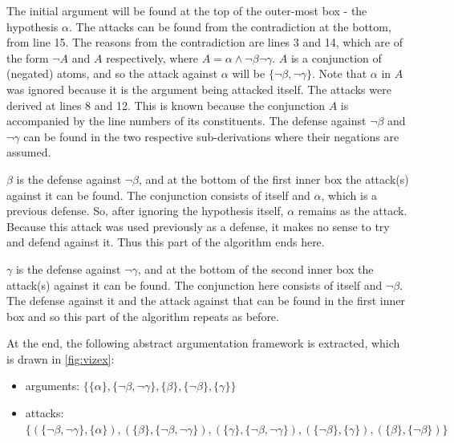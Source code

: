 \documentclass[11pt,twoside,a4paper]{report}
\begin{document}
The initial argument will be found at the top of the outer-most box - the hypothesis $\alpha$. The attacks can be found from the contradiction at the bottom, from line 15. The reasons from the contradiction are lines 3 and 14, which are of the form $\neg A$ and $A$ respectively, where $A = \alpha\wedge\neg\beta\neg\gamma$. $A$ is a conjunction of (negated) atoms, and so the attack against $\alpha$ will be $\{\neg\beta, \neg\gamma\}$. Note that $\alpha$ in $A$ was ignored because it is the argument being attacked itself. The attacks were derived at lines 8 and 12. This is known because the conjunction $A$ is accompanied by the line numbers of its constituents. The defense against $\neg\beta$ and $\neg\gamma$ can be found in the two respective sub-derivations where their negations are assumed. 

$\beta$ is the defense against $\neg\beta$, and at the bottom of the first inner box the attack(s) against it can be found. The conjunction consists of itself and $\alpha$, which is a previous defense. So, after ignoring the hypothesis itself, $\alpha$ remains as the attack. Because this attack was used previously as a defense, it makes no sense to try and defend against it. Thus this part of the algorithm ends here.

$\gamma$ is the defense against $\neg\gamma$, and at the bottom of the second inner box the attack(s) against it can be found. The conjunction here consists of itself and $\neg\beta$. The defense against it and the attack against that can be found in the first inner box and so this part of the algorithm repeats as before.

At the end, the following abstract argumentation framework is extracted, which is drawn in \autoref{fig:vizex}:
\begin{itemize}
\item
arguments: $\{\{\alpha\}, \{\neg\beta, \neg\gamma\}, \{\beta\}, \{\neg\beta\}, \{\gamma\}\}$
\item
attacks: $\{(\{\neg\beta, \neg\gamma\}, \{\alpha\}), (\{\beta\}, \{\neg\beta, \neg\gamma\}), (\{\gamma\}, \{\neg\beta, \neg\gamma\}), (\{\neg\beta\}, \{\gamma\}), (\{\beta\}, \{\neg\beta\})\}$
\end{itemize}
\end{document}
